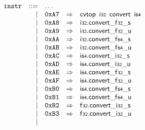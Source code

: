 $$
\begin{array}{@{}l@{}rrlll@{}l@{}}
& {\mathtt{instr}} &::=& \dots \\ &&|&
\mathtt{0xA7} &\Rightarrow& \mathsf{cvtop}~\,\mathsf{i{\scriptstyle32}}~\,\mathsf{convert}~\,\mathsf{i{\scriptstyle64}} \\ &&|&
\mathtt{0xA8} &\Rightarrow& \mathsf{i{\scriptstyle32}} . {{{{\mathsf{convert}}{\mathsf{\_}}}{\mathsf{f{\scriptstyle32}}}}{\mathsf{\_}}}{\mathsf{s}} \\ &&|&
\mathtt{0xA9} &\Rightarrow& \mathsf{i{\scriptstyle32}} . {{{{\mathsf{convert}}{\mathsf{\_}}}{\mathsf{f{\scriptstyle32}}}}{\mathsf{\_}}}{\mathsf{u}} \\ &&|&
\mathtt{0xAA} &\Rightarrow& \mathsf{i{\scriptstyle32}} . {{{{\mathsf{convert}}{\mathsf{\_}}}{\mathsf{f{\scriptstyle64}}}}{\mathsf{\_}}}{\mathsf{s}} \\ &&|&
\mathtt{0xAB} &\Rightarrow& \mathsf{i{\scriptstyle32}} . {{{{\mathsf{convert}}{\mathsf{\_}}}{\mathsf{f{\scriptstyle64}}}}{\mathsf{\_}}}{\mathsf{u}} \\ &&|&
\mathtt{0xAC} &\Rightarrow& \mathsf{i{\scriptstyle64}} . {{{{\mathsf{convert}}{\mathsf{\_}}}{\mathsf{i{\scriptstyle32}}}}{\mathsf{\_}}}{\mathsf{s}} \\ &&|&
\mathtt{0xAD} &\Rightarrow& \mathsf{i{\scriptstyle64}} . {{{{\mathsf{convert}}{\mathsf{\_}}}{\mathsf{i{\scriptstyle32}}}}{\mathsf{\_}}}{\mathsf{u}} \\ &&|&
\mathtt{0xAE} &\Rightarrow& \mathsf{i{\scriptstyle64}} . {{{{\mathsf{convert}}{\mathsf{\_}}}{\mathsf{f{\scriptstyle32}}}}{\mathsf{\_}}}{\mathsf{s}} \\ &&|&
\mathtt{0xAF} &\Rightarrow& \mathsf{i{\scriptstyle64}} . {{{{\mathsf{convert}}{\mathsf{\_}}}{\mathsf{f{\scriptstyle32}}}}{\mathsf{\_}}}{\mathsf{u}} \\ &&|&
\mathtt{0xB0} &\Rightarrow& \mathsf{i{\scriptstyle64}} . {{{{\mathsf{convert}}{\mathsf{\_}}}{\mathsf{f{\scriptstyle64}}}}{\mathsf{\_}}}{\mathsf{s}} \\ &&|&
\mathtt{0xB1} &\Rightarrow& \mathsf{i{\scriptstyle64}} . {{{{\mathsf{convert}}{\mathsf{\_}}}{\mathsf{f{\scriptstyle64}}}}{\mathsf{\_}}}{\mathsf{u}} \\ &&|&
\mathtt{0xB2} &\Rightarrow& \mathsf{f{\scriptstyle32}} . {{{{\mathsf{convert}}{\mathsf{\_}}}{\mathsf{i{\scriptstyle32}}}}{\mathsf{\_}}}{\mathsf{s}} \\ &&|&
\mathtt{0xB3} &\Rightarrow& \mathsf{f{\scriptstyle32}} . {{{{\mathsf{convert}}{\mathsf{\_}}}{\mathsf{i{\scriptstyle32}}}}{\mathsf{\_}}}{\mathsf{u}} \\ &&|&

\end{array}$$
